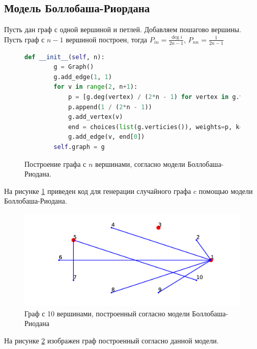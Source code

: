 \subsection{Модель Боллобаша-Риордана}
Пусть дан граф с одной вершиной и петлей. 
Добавляем пошагово вершины. Пусть граф с $n-1$ 
вершиной построен, тогда 
$P_{in} = \frac{\deg{i}}{2n - 1}$, $P_{nn} = \frac{1}{2n - 1}$
\begin{figure}[H] 
\begin{lstlisting}[language=Python] 
    def __init__(self, n):
        g = Graph()
        g.add_edge(1, 1)
        for v in range(2, n+1):
            p = [g.deg(vertex) / (2*n - 1) for vertex in g.verticies()]
            p.append(1 / (2*n - 1))
            g.add_vertex(v)
            end = choices(list(g.verticies()), weights=p, k=1)
            g.add_edge(v, end[0])
        self.graph = g
\end{lstlisting}  
    \caption{Построение графа с $n$ вершинами, согласно модели 
    Боллобаша-Риодана.}
    \label{br_1}
\end{figure} 
На рисунке \ref{br_1} приведен код для генерации случайного графа
c помощью модели Боллобаша-Риодана.
\begin{figure}[H] 
    \includegraphics{br.pdf} 
    \caption{Граф с 10 вершинами, построенный согласно модели
    Боллобаша-Риодана}
    \label{br_2}
\end{figure} 
На рисунке \ref{br_2} изображен граф построенный согласно данной модели.
